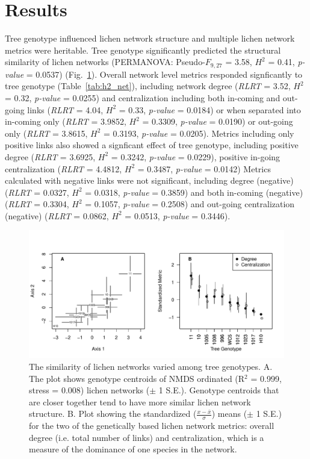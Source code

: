 \documentclass[11pt,twocolumn,twoside,lineno]{pnas-new}
\begin{document}
\showmatmethods{} %

\section*{Results}


Tree genotype influenced lichen network structure and multiple lichen
network metrics were heritable.  Tree genotype significantly predicted
the structural similarity of lichen networks (PERMANOVA:
Pseudo-$F_{9,27}$ = 3.58, $H^2$ = 0.41, \textit{p-value} = 0.0537)
(Fig.~\ref{fig:h2_plot}).  Overall network level metrics responded
signficantly to tree genotype (Table~\ref{tab:h2_net}), including
network degree (\textit{RLRT} = 3.52, $H^2$ = 0.32, \textit{p-value} =
0.0255) and centralization including both in-coming and out-going
links (\textit{RLRT} = 4.04, $H^2$ = 0.33, \textit{p-value} = 0.0184)
or when separated into in-coming only (\textit{RLRT} = 3.9852, $H^2$ =
0.3309, \textit{p-value} = 0.0190) or out-going only (\textit{RLRT} =
3.8615, $H^2$ = 0.3193, \textit{p-value} = 0.0205).  Metrics including
only positive links also showed a signficant effect of tree genotype,
including positive degree (\textit{RLRT} = 3.6925, $H^2$ = 0.3242,
\textit{p-value} = 0.0229), positive in-going centralization
(\textit{RLRT} = 4.4812, $H^2$ = 0.3487, \textit{p-value} = 0.0142)
Metrics calculated with negative links were not significant, including
degree (negative) (\textit{RLRT} = 0.0327, $H^2$ = 0.0318,
\textit{p-value} = 0.3859) and both in-coming (negative)
(\textit{RLRT} = 0.3304, $H^2$ = 0.1057, \textit{p-value} = 0.2508)
and out-going centralization (negative) (\textit{RLRT} = 0.0862, $H^2$
= 0.0513, \textit{p-value} = 0.3446).

\begin{figure}[ht]
\centering
\includegraphics[width=\linewidth]{h2_plot.pdf}
\caption{The similarity of lichen networks varied among tree
  genotypes. A. The plot shows genotype centroids of NMDS ordinated
  (R$^2$ = 0.999, stress = 0.008) lichen networks ($\pm$ 1
  S.E.). Genotype centroids that are closer together tend to have more
  similar lichen network structure.  B. Plot showing the standardized
  ($\frac{x - \bar{x}}{\sigma}$) means ($\pm$ 1 S.E.)  for the two of
  the genetically based lichen network metrics: overall degree
  (i.e. total number of links) and centralization, which is a measure
  of the dominance of one species in the network.}
\label{fig:h2_plot}
\end{figure}
\end{document}
